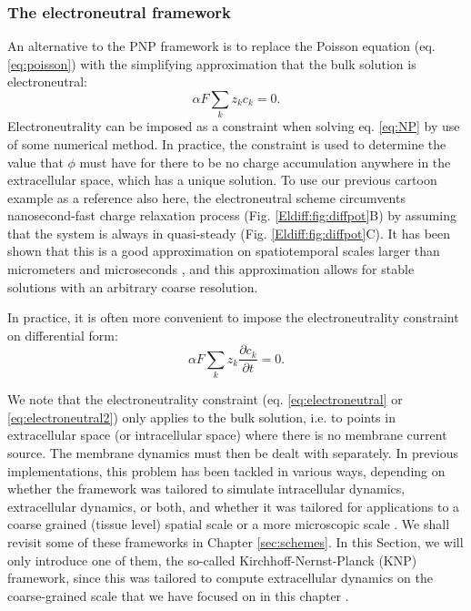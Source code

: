 \subsubsection{The electroneutral framework}
An alternative to the PNP framework is to replace the Poisson equation (eq. \ref{eq:poisson}) with the simplifying approximation that the bulk solution is electroneutral:
\begin{equation}
\alpha F \sum_k z_k c_k = 0.
\label{eq:electroneutral}
\end{equation}
Electroneutrality can be imposed as a constraint when solving eq. \ref{eq:NP} by use of some numerical method. In practice, the constraint is used to determine the value that $\phi$ must have for there to be no charge accumulation anywhere in the extracellular space, which has a unique solution. To use our previous cartoon example as a reference also here, the electroneutral scheme circumvents nanosecond-fast charge relaxation process (Fig. \ref{Eldiff:fig:diffpot}B) by assuming that the system is always in quasi-steady (Fig. \ref{Eldiff:fig:diffpot}C). It has been shown that this is a good approximation on spatiotemporal scales larger than micrometers and microseconds \citep{Grodzinsky2011, Pods2017, Solbra2018}, and this approximation allows for stable solutions with an arbitrary coarse resolution.

In practice, it is often more convenient to impose the electroneutrality constraint on differential form:
\begin{equation}
\alpha F \sum_k{z_k \frac{\partial c_k}{\partial t}} = 0.
\label{eq:electroneutral2}
\end{equation}

We note that the electroneutrality constraint (eq. \ref{eq:electroneutral} or \ref{eq:electroneutral2}) only applies to the bulk solution, i.e. to points in extracellular space (or intracellular space) where there is no membrane current source. The membrane dynamics must then be dealt with separately. In previous implementations, this problem has been tackled in various ways, depending on whether the framework was tailored to simulate intracellular dynamics, extracellular dynamics, or both, and whether it was tailored for applications to a coarse grained (tissue level) spatial scale or a more microscopic scale \citep{Mori2008, Mori2009, Mori2009a, Mori2011, Halnes2015, Halnes2013, Pods2017, Niederer2013, OConnell2016, Solbra2018, tuttle2019, ellingsrud2019}. We shall revisit some of these frameworks in Chapter \ref{sec:schemes}. In this Section, we will only introduce one of them, the so-called Kirchhoff-Nernst-Planck (KNP) framework, since this was tailored to compute extracellular dynamics on the coarse-grained scale that we have focused on in this chapter \citep{Solbra2018}.


